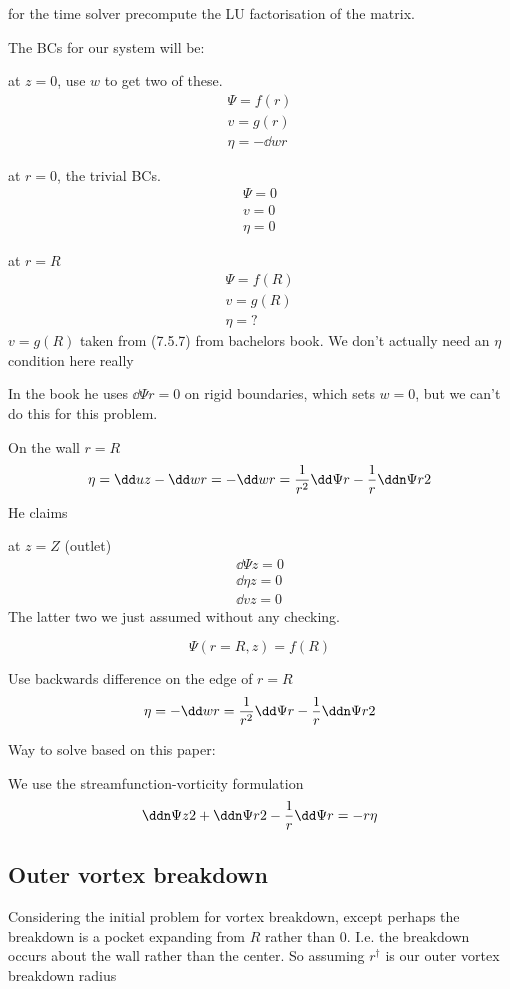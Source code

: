 \documentclass{X:/Documents/Coding/Latex/myreport}
\begin{document}
for the time solver precompute the LU factorisation of the matrix.


The BCs for our system will be:


at $z=0$, use $w$ to get two of these.
\begin{align*}
    \Psi = f(r)\\     
    v = g(r)\\
    \eta = - \dd wr
\end{align*} 


at $r=0$, the trivial BCs.
\begin{align*}
    \Psi= 0\\
    v = 0\\
    \eta = 0
\end{align*}


at $r= R$
\begin{align*}
    \Psi = f(R)\\
    v = g(R)\\
    \eta = ?
\end{align*}
$v = g(R)$ taken from (7.5.7) from bachelors book.
We don't actually need an $\eta$ condition here really


In the book he uses $\dd \Psi r = 0$ on rigid boundaries, which sets $w=0$, but we can't do this for this problem. 

On the wall $r=R$
\[\eta = \dd uz - \dd wr = - \dd wr = \frac1{r^2} \dd \Psi r - \frac1r \ddn \Psi r 2\]
He claims 


at $z=Z$ (outlet)
\begin{align*}
    \dd\Psi z = 0\\
    \dd \eta z = 0\\
    \dd vz = 0 
\end{align*}
The latter two we just assumed without any checking.

\[\Psi(r=R,z) = f(R)\]


Use backwards difference on the edge of $r=R$ 
\[\eta = - \dd wr =  \frac{1}{r^2} \dd\Psi r - \frac1r \ddn \Psi r 2\]


Way to solve based on this paper:

We use the streamfunction-vorticity formulation
\[\ddn \Psi z2 + \ddn \Psi r2 - \frac1r \dd \Psi r = -r \eta\]





\clearpage
\subsection{Outer vortex breakdown}
Considering the initial problem for vortex breakdown, except perhaps the breakdown is a pocket expanding from $R$ rather than $0$. I.e. the breakdown occurs about the wall rather than the center.
So assuming $r^\dagger $ is our outer vortex breakdown radius
\end{document}
